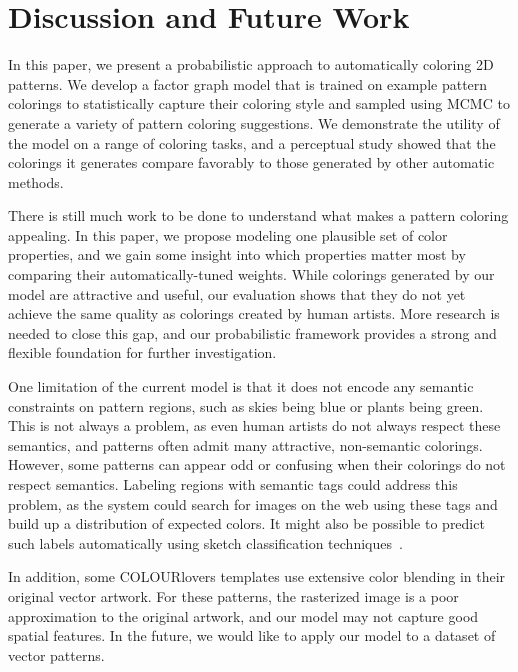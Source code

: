 \section{Discussion and Future Work}
\label{sec:discussion}

In this paper, we present a probabilistic approach to automatically coloring 2D patterns. We develop a factor graph model that is trained on example pattern colorings to statistically capture their coloring style and sampled using MCMC to generate a variety of pattern coloring suggestions. We demonstrate the utility of the model on a range of coloring tasks, and a perceptual study showed that the colorings it generates compare favorably to those generated by other automatic methods.

There is still much work to be done to understand what makes a pattern coloring appealing. In this paper, we propose modeling one plausible set of color properties, and we gain some insight into which properties matter most by comparing their automatically-tuned weights. While colorings generated by our model are attractive and useful, our evaluation shows that they do not yet achieve the same quality as colorings created by human artists. More research is needed to close this gap, and our probabilistic framework provides a strong and flexible foundation for further investigation.

One limitation of the current model is that it does not encode any semantic constraints on pattern regions, such as skies being blue or plants being green. This is not always a problem, as even human artists do not always respect these semantics, and patterns often admit many attractive, non-semantic colorings. However, some patterns can appear odd or confusing when their colorings do not respect semantics.
Labeling regions with semantic tags could address this problem, as the system could search for images on the web using these tags and build up a distribution of expected colors. It might also be possible to predict such labels automatically using sketch classification techniques~\cite{SketchClassification}.

In addition, some COLOURlovers templates use extensive color blending in their original vector artwork. For these patterns, the rasterized image is a poor approximation to the original artwork, and our model may not capture good spatial features. In the future, we would like to apply our model to a dataset of vector patterns.

